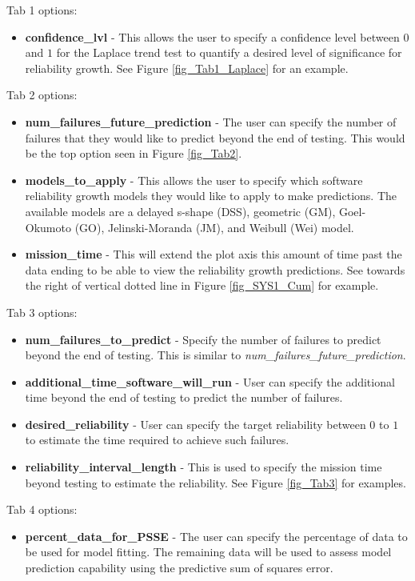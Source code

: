 \documentclass[conference]{IEEEtran}
\begin{document}
\noindent Tab 1 options:
    \begin{itemize}
    \item{\textbf{confidence\_lvl} - This allows the user to specify a confidence level between $0$ and $1$ for the Laplace trend test to quantify a desired level of significance for reliability growth. See Figure \ref{fig_Tab1_Laplace} for an example.}
    \end{itemize}

\noindent Tab 2 options:
    \begin{itemize}
      \item {\textbf{num\_failures\_future\_prediction} - The user can specify the number of failures that they would like to predict beyond the end of testing. This would be the top option seen in Figure \ref{fig_Tab2}.}
      \item {\textbf{models\_to\_apply} - This allows the user to specify which software reliability growth models they would like to apply to make predictions. The available models are a delayed s-shape (DSS), geometric (GM), Goel-Okumoto (GO), Jelinski-Moranda (JM), and Weibull (Wei) model. }
      \item {\textbf{mission\_time} - This will extend the plot axis this amount of time past the data ending to be able to view the reliability growth predictions. See towards the right of vertical dotted line in Figure \ref{fig_SYS1_Cum} for example.}
    \end{itemize}

\noindent Tab 3 options:
    \begin{itemize}
      \item {\textbf{num\_failures\_to\_predict} - Specify the number of failures to predict beyond the end of testing. This is similar to \textit{num\_failures\_future\_prediction}.}
      \item {\textbf{additional\_time\_software\_will\_run} - User can specify the additional time beyond the end of testing to predict the number of failures. }
      \item {\textbf{desired\_reliability} - User can specify the target reliability between $0$ to $1$ to estimate the time required to achieve such failures.}
      \item {\textbf{reliability\_interval\_length} - This is used to specify the mission time beyond testing to estimate the reliability. See Figure \ref{fig_Tab3} for examples.}
    \end{itemize}

\noindent Tab 4 options:
    \begin{itemize}
    \item{\textbf{percent\_data\_for\_PSSE} - The user can specify the percentage of data to be used for model fitting. The remaining data will be used to assess model prediction capability using the predictive sum of squares error.}
    \end{itemize}
\end{document}
